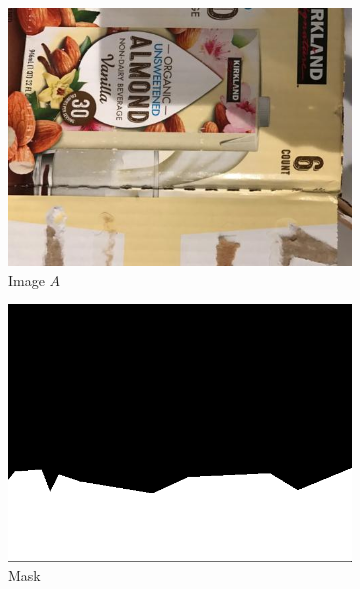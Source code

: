 \documentclass{article}
\begin{document}
\begin{figure}
  \centering
  \begin{subfigure}[b]{0.2\linewidth}
    \includegraphics[width=\linewidth]{data/images/04_GP_GAN/cardboard254.jpg}
     \caption{Image $A$ }
  \end{subfigure}
  \begin{subfigure}[b]{0.2\linewidth}
    \includegraphics[width=\linewidth]{data/images/04_GP_GAN/mask_display.png}
    \caption{Mask}
  \end{subfigure}
  \begin{subfigure}[b]{0.2\linewidth}

\end{subfigure}
\end{figure}
\end{document}
